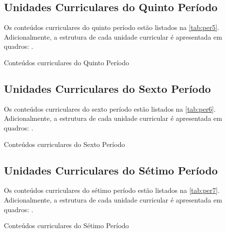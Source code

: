 \clearpage

\subsection{Unidades Curriculares do Quinto Período}

Os conteúdos curriculares do quinto período estão listados na \autoref{tab:per5}. Adicionalmente, a estrutura de cada unidade curricular é apresentada em quadros: .

\begin{table}[!htb]
	\centering\footnotesize
	\caption{Conteúdos curriculares do Quinto Período}
	\label{tab:per5}
\end{table}

\clearpage

\subsection{Unidades Curriculares do Sexto Período}

Os conteúdos curriculares do sexto período estão listados na \autoref{tab:per6}. Adicionalmente, a estrutura de cada unidade curricular é apresentada em quadros: .

\begin{table}[!htb]
	\centering\footnotesize
	\caption{Conteúdos curriculares do Sexto Período}
	\label{tab:per6}
\end{table}

\clearpage

\subsection{Unidades Curriculares do Sétimo Período}

Os conteúdos curriculares do sétimo período estão listados na \autoref{tab:per7}. Adicionalmente, a estrutura de cada unidade curricular é apresentada em quadros: .

\begin{table}[!htb]
	\centering\footnotesize
	\caption{Conteúdos curriculares do Sétimo Período}
	\label{tab:per7}
\end{table}

